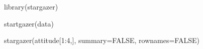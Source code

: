 


library(stargazer)

startgazer(data)

stargazer(attitude[1:4,], summary=FALSE, rownames=FALSE)













